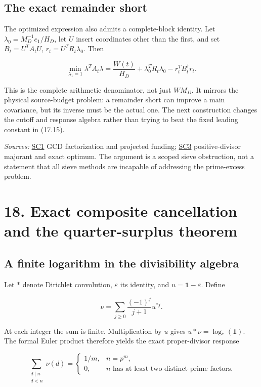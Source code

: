 \documentclass[
  10pt,
  a4paper,
  10pt,
  oneside,
  openany]{book}
\begin{document}
\subsection{The exact remainder short}\label{the-exact-remainder-short}

The optimized expression also admits a complete-block identity. Let
\(\lambda_0=M_D^{-1}e_1/H_D\), let \(U\) insert coordinates other than
the first, and set \(B_t=U^TA_tU\), \(r_t=U^TR_t\lambda_0\). Then

\[
\min_{\lambda_1=1}\lambda^TA_t\lambda
=\frac{W(t)}{H_D}+\lambda_0^TR_t\lambda_0
-r_t^TB_t^\dagger r_t.
\tag{17.16}\label{eq:17.16}
\]

This is the complete arithmetic denominator, not just \(WM_D\). It
mirrors the physical source-budget problem: a remainder short can
improve a main covariance, but its inverse must be the actual one. The
next construction changes the cutoff and response algebra rather than
trying to beat the fixed leading constant in (17.15).

\emph{Sources:} \hyperref[source-sc1]{SC1} GCD factorization and
projected funding; \hyperref[source-sc3]{SC3} positive-divisor majorant
and exact optimum. The argument is a scoped sieve obstruction, not a
statement that all sieve methods are incapable of addressing the
prime-excess problem.

\section{18. Exact composite cancellation and the quarter-surplus
theorem}\label{ch-quarter}

\subsection{A finite logarithm in the divisibility
algebra}\label{a-finite-logarithm-in-the-divisibility-algebra}

Let \(*\) denote Dirichlet convolution, \(\varepsilon\) its identity,
and \(u=\mathbf1-\varepsilon\). Define

\[
\nu=\sum_{j\ge0}\frac{(-1)^j}{j+1}u^{*j}.
\tag{18.1}\label{eq:18.1}
\]

At each integer the sum is finite. Multiplication by \(u\) gives
\(u*\nu=\log_*(\mathbf1)\). The formal Euler product therefore yields
the exact proper-divisor response

\[
\sum_{\substack{d\mid n\\d<n}}\nu(d)
=\begin{cases}
1/m,&n=p^m,\\
0,&n\text{ has at least two distinct prime factors}.
\end{cases}
\tag{18.2}\label{eq:18.2}
\]
\end{document}
